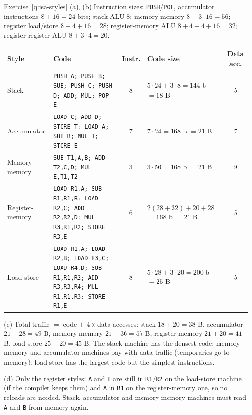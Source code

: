 \begin{noot}{Exercise~\ref{q:isa-styles}}
(a), (b) Instruction sizes: \texttt{PUSH}/\texttt{POP}, accumulator
instructions $8+16=24$ bits; stack ALU $8$; memory-memory $8+3\cdot16=56$;
register load/store $8+4+16=28$; register-memory ALU $8+4+4+16=32$;
register-register ALU $8+3\cdot4=20$.
\begin{center}
\footnotesize
\begin{tabular}{@{}p{1.9cm}p{6.1cm}cp{2.5cm}c@{}}
\toprule
Style & Code & Instr. & Code size & Data acc. \\
\midrule
Stack & \texttt{PUSH A; PUSH B; SUB; PUSH C; PUSH D; ADD; MUL; POP E} & 8 &
$5\cdot24+3\cdot8=144$ b $=18$ B & 5 \\
Accumulator & \texttt{LOAD C; ADD D; STORE T; LOAD A; SUB B; MUL T; STORE E} & 7 &
$7\cdot24=168$ b $=21$ B & 7 \\
Memory-memory & \texttt{SUB T1,A,B; ADD T2,C,D; MUL E,T1,T2} & 3 &
$3\cdot56=168$ b $=21$ B & 9 \\
Register-memory & \texttt{LOAD R1,A; SUB R1,R1,B; LOAD R2,C; ADD R2,R2,D; MUL R3,R1,R2; STORE R3,E} & 6 &
$2(28{+}32){+}20{+}28$ $=168$ b $=21$ B & 5 \\
Load-store & \texttt{LOAD R1,A; LOAD R2,B; LOAD R3,C; LOAD R4,D; SUB R1,R1,R2; ADD R3,R3,R4; MUL R1,R1,R3; STORE R1,E} & 8 &
$5\cdot28+3\cdot20=200$ b $=25$ B & 5 \\
\bottomrule
\end{tabular}
\end{center}
(c) Total traffic $=$ code $+$ $4\times$data accesses: stack $18+20=38$ B,
accumulator $21+28=49$ B, memory-memory $21+36=57$ B, register-memory
$21+20=41$ B, load-store $25+20=45$ B. The stack machine has the densest code;
memory-memory and accumulator machines pay with data traffic (temporaries go to
memory); load-store has the largest code but the simplest instructions.

(d) Only the register styles: \texttt{A} and \texttt{B} are still in
\texttt{R1}/\texttt{R2} on the load-store machine (if the compiler keeps
them) and \texttt{A} in \texttt{R1} on the register-memory one, so no reloads
are needed. Stack, accumulator and memory-memory machines must read \texttt{A}
and \texttt{B} from memory again.
\end{noot}

